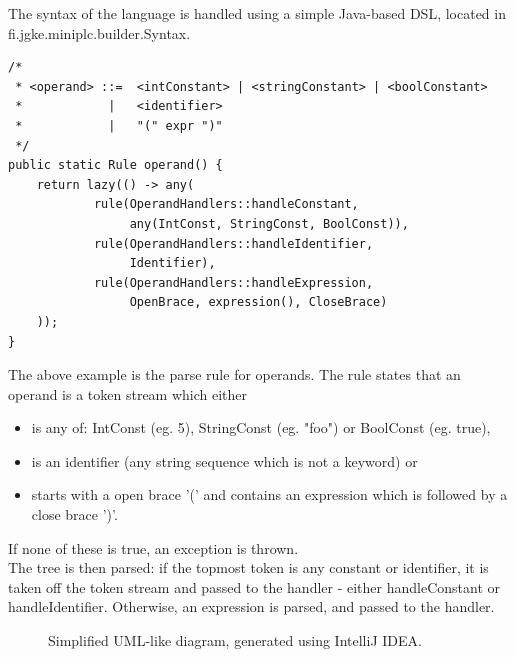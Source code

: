 \documentclass{article}
\begin{document}
The syntax of the language is handled using a simple Java-based DSL, located in
fi.jgke.miniplc.builder.Syntax.

\begin{verbatim}
/*
 * <operand> ::=  <intConstant> | <stringConstant> | <boolConstant>
 *            |   <identifier>
 *            |   "(" expr ")"
 */
public static Rule operand() {
    return lazy(() -> any(
            rule(OperandHandlers::handleConstant,
                 any(IntConst, StringConst, BoolConst)),
            rule(OperandHandlers::handleIdentifier,
                 Identifier),
            rule(OperandHandlers::handleExpression,
                 OpenBrace, expression(), CloseBrace)
    ));
}
\end{verbatim}

The above example is the parse rule for operands. The rule states that an
operand is a token stream which either

\begin{itemize}
    \item is any of: IntConst (eg. 5), StringConst (eg. "foo") or BoolConst
        (eg. true),
    \item is an identifier (any string sequence which is not a keyword) or
    \item starts with a open brace '(' and contains an expression which is
        followed by a close brace ')'.
\end{itemize}
\noindent
If none of these is true, an exception is thrown. \\

The tree is then parsed: if the topmost token is any constant or identifier,
it is taken off the token stream and passed to the handler - either handleConstant or handleIdentifier.
Otherwise, an expression is parsed, and passed to the handler.

\FloatBarrier
\begin{figure}[ht!]
    \begin{center}
    \end{center}
    \caption{Simplified UML-like diagram, generated using IntelliJ IDEA.}
    \label{fig:uml}
\end{figure}
\FloatBarrier
\end{document}
